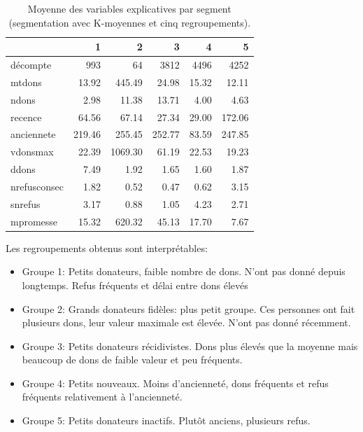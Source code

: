 \documentclass[
  11pt,
  letterpaper,
]{book}
\newenvironment{Shaded}{\begin{snugshade}}{\end{snugshade}}
\newcommand{\AttributeTok}[1]{\textcolor[rgb]{0.40,0.45,0.13}{#1}}
\newcommand{\FunctionTok}[1]{\textcolor[rgb]{0.28,0.35,0.67}{#1}}
\newcommand{\NormalTok}[1]{\textcolor[rgb]{0.00,0.23,0.31}{#1}}
\newcommand{\SpecialCharTok}[1]{\textcolor[rgb]{0.37,0.37,0.37}{#1}}
\providecommand{\tightlist}{%
  \setlength{\itemsep}{0pt}\setlength{\parskip}{0pt}}\usepackage{longtable,booktabs,array}
\theoremstyle{definition}
\theoremstyle{remark}
\begin{document}
\begin{Shaded}
\end{Shaded}

\hypertarget{tbl-kmoy5resume}{}
\begin{table}
\caption{\label{tbl-kmoy5resume}Moyenne des variables explicatives par segment (segmentation avec
K-moyennes et cinq regroupements). }\tabularnewline

\centering
\begin{tabular}{l|r|r|r|r|r}
\hline
  & 1 & 2 & 3 & 4 & 5\\
\hline
décompte & 993 & 64 & 3812 & 4496 & 4252\\
\hline
mtdons & 13.92 & 445.49 & 24.98 & 15.32 & 12.11\\
\hline
ndons & 2.98 & 11.38 & 13.71 & 4.00 & 4.63\\
\hline
recence & 64.56 & 67.14 & 27.34 & 29.00 & 172.06\\
\hline
anciennete & 219.46 & 255.45 & 252.77 & 83.59 & 247.85\\
\hline
vdonsmax & 22.39 & 1069.30 & 61.19 & 22.53 & 19.23\\
\hline
ddons & 7.49 & 1.92 & 1.65 & 1.60 & 1.87\\
\hline
nrefusconsec & 1.82 & 0.52 & 0.47 & 0.62 & 3.15\\
\hline
snrefus & 3.17 & 0.88 & 1.05 & 4.23 & 2.71\\
\hline
mpromesse & 15.32 & 620.32 & 45.13 & 17.70 & 7.67\\
\hline
\end{tabular}
\end{table}

Les regroupements obtenus sont interprétables:

\begin{itemize}
\tightlist
\item
  Groupe 1: Petits donateurs, faible nombre de dons. N'ont pas donné
  depuis longtemps. Refus fréquents et délai entre dons élevés
\item
  Groupe 2: Grands donateurs fidèles: plus petit groupe. Ces personnes
  ont fait plusieurs dons, leur valeur maximale est élevée. N'ont pas
  donné récemment.
\item
  Groupe 3: Petits donateurs récidivistes. Dons plus élevés que la
  moyenne mais beaucoup de dons de faible valeur et peu fréquents.
\item
  Groupe 4: Petits nouveaux. Moins d'ancienneté, dons fréquents et refus
  fréquents relativement à l'ancienneté.
\item
  Groupe 5: Petits donateurs inactifs. Plutôt anciens, plusieurs refus.
\end{itemize}
\end{document}

